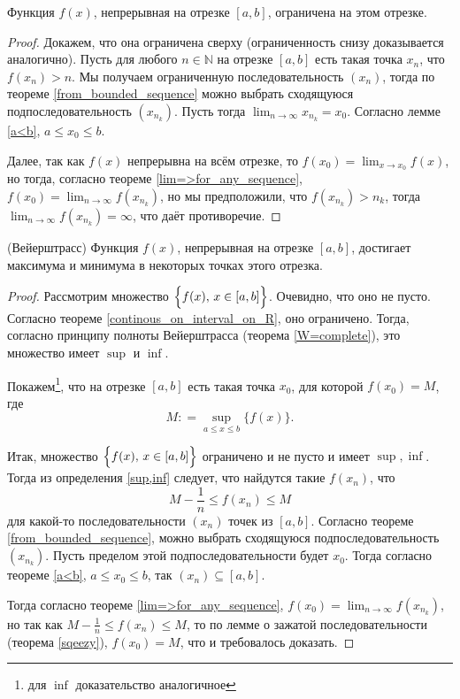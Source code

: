 \begin{theorem}\label{continous_on_interval_on_R}
    Функция $f(x)$, непрерывная на отрезке $[a,b]$, ограничена на этом отрезке.
\end{theorem}
\begin{proof}
    Докажем, что она ограничена сверху (ограниченность снизу доказывается аналогично). Пусть для любого $n\in \mathbb{N}$ на отрезке $[a,b]$ есть такая точка $x_n$, что $f(x_n) >n$. Мы получаем ограниченную последовательность $(x_n)$, тогда по теореме \ref{from_bounded_sequence} можно выбрать сходящуюся подпоследовательность $(x_{n_k})$. Пусть тогда $\lim_{n\to \infty}x_{n_k} = x_0$. Согласно лемме \ref{a<b}, $a\le x_0 \le b$. 

    Далее, так как $f(x)$ непрерывна на всём отрезке, то $f(x_0) = \lim_{x\to x_0}f(x)$, но тогда, согласно теореме \ref{lim=>for_any_sequence}, $f(x_0)  = \lim_{n\to \infty} f(x_{n_k})$, но мы предположили, что $f(x_{n_k}) > n_k$, тогда $\lim_{n\to \infty} f(x_{n_k}) = \infty$, что даёт противоречие.
\end{proof}

\begin{theorem}(Вейерштрасс)\label{W2_on_R}
    Функция $f(x)$, непрерывная на отрезке $[a,b]$, достигает максимума и минимума в некоторых точках этого отрезка.
\end{theorem}
\begin{proof}

Рассмотрим множество $\Bigl\{f(x),\, x \in [a,b] \Bigr\}$. Очевидно, что оно не пусто. Согласно теореме \ref{continous_on_interval_on_R}, оно ограничено. Тогда, согласно принципу полноты Вейерштрасса (теорема \ref{W=complete}), это множество имеет $\sup$ и $\inf$.

Покажем\footnote{для $\inf$ доказательство аналогичное}, что на отрезке $[a,b]$ есть такая точка $x_0$, для которой $f(x_0) = M$, где
\[
M: = \sup_{a \le x \le b}\{f(x)\}.
\]

Итак, множество $\Bigl\{f(x),\, x\in  [a,b] \Bigr\}$ ограничено и не пусто и имеет $\sup, \inf$. Тогда из определения \ref{sup,inf} следует, что найдутся такие $f(x_n)$, что 
$$M - \frac{1}{n} \le f(x_n) \le M$$
для какой-то последовательности $(x_n)$ точек из $[a,b]$. Согласно теореме \ref{from_bounded_sequence}, можно выбрать сходящуюся подпоследовательность $(x_{n_k})$. Пусть пределом этой подпоследовательности будет $x_0$. Тогда согласно теореме \ref{a<b}, $a\le x_0 \le b$, так $(x_n) \subseteq [a,b].$

Тогда согласно теореме \ref{lim=>for_any_sequence}, $f(x_0)  = \lim_{n \to \infty} f(x_{n_k})$, но так как $M - \frac{1}{n} \le f(x_n) \le M$, то по лемме о зажатой последовательности (теорема \ref{sqeezy}), $f(x_0) = M$, что и требовалось доказать. 
\end{proof}

